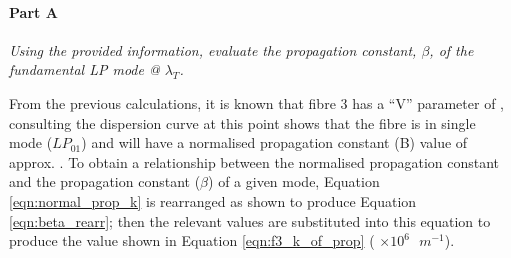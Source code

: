 \documentclass[colorlinks,11pt,a4paper,normalphoto,withhyper,ragged2e]{altareport}
\begin{document}
\paragraph{Part A \linebreak}
\textit{Using the provided information, evaluate the propagation constant, $\beta$, of the fundamental LP mode @ $\lambda_T$.} \linebreak

From the previous calculations, it is known that fibre 3 has a ``V'' parameter of , consulting the dispersion curve at this point shows that the fibre is in single mode ($LP_{01}$) and will have a normalised propagation constant (B) value of approx. . \linebreak
To obtain a relationship between the normalised propagation constant and the propagation constant ($\beta$) of a given mode, Equation \ref{eqn:normal_prop_k} is rearranged as shown to produce Equation \ref{eqn:beta_rearr}; then the relevant values are substituted into this equation to produce the value shown in Equation \ref{eqn:f3_k_of_prop} ( $\times 10^6 \text{ } m^{-1}$).
\end{document}
